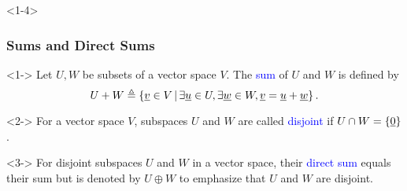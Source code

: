 \documentclass[10pt,english,aspectratio=169]{beamer}
\begin{document}
\begin{frame}<1-4> \frametitle{Sums and Direct Sums}

\vspace{-1mm}

\begin{definition}<1->
Let $U,W$ be subsets of a vector space $V$.
The \textcolor{blue}{sum} of $U$ and $W$ is defined by \vspace{-2mm}
\begin{equation*}
U + W \triangleq \left\{ \underline{v} \in V \, \middle| \, \exists \underline{u} \in U, \exists \underline{w} \in W, \underline{v} = \underline{u} + \underline{w} \right\}.
\end{equation*}
\end{definition}

\begin{definition}<2->
For a vector space $V$, subspaces $U$ and $W$ are called \textcolor{blue}{disjoint} if $U \cap W = \{\underline{0}\}$.
\end{definition}

\begin{definition}<3->
For disjoint subspaces $U$ and $W$ in a vector space, their \textcolor{blue}{direct sum}  equals their sum but is denoted by $U \oplus W$ to emphasize that $U$ and $W$ are disjoint.
\end{definition}

\vspace{1mm}


\vspace{-1mm}


\end{frame}
\end{document}
